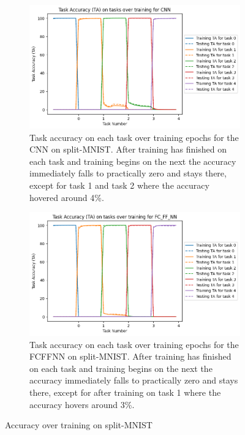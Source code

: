 \begin{figure}[htbp]
    \centering
    \begin{subfigure}[t]{0.45\linewidth}
      \centering
      \includegraphics[width=\textwidth]{images/MNIST_CL/CNN_TA_task.png}
      \caption{Task accuracy on each task over training epochs for the CNN on split-MNIST. After training has finished on each task and training begins on the next the accuracy immediately falls to practically zero and stays there, except for task 1 and task 2 where the accuracy hovered around 4\%.}
      \label{fig:MNIST-CL-CNN-TA}
    \end{subfigure}
    \hspace{0.5cm}
    \begin{subfigure}[t]{0.45\linewidth}
      \centering
      \includegraphics[width=\textwidth]{images/MNIST_CL/FC_FF_NN_TA_task.png}
      \caption{Task accuracy on each task over training epochs for the FCFFNN on split-MNIST. After training has finished on each task and training begins on the next the accuracy immediately falls to practically zero and stays there, except for after training on task 1 where the accuracy hovers around 3\%.}
      \label{fig:MNIST-CL-FCFFNN-TA}
    \end{subfigure}
    \caption{Accuracy over training on split-MNIST}
    \label{fig:MNIST-CL-TA}
\end{figure}

